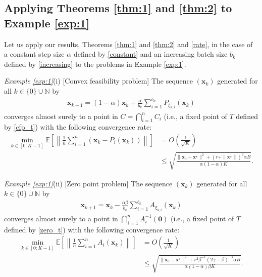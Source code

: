\documentclass[smallextended,referee,envcountsect,]{svjour3}
\begin{document}
\subsection{Applying Theorems \ref{thm:1} and \ref{thm:2} to Example \ref{exp:1}} 
Let us apply our results, Theorems \ref{thm:1} and \ref{thm:2} and \eqref{rate}, in the case of a constant step size $\alpha$ defined by \eqref{constant} and an increasing batch size $b_k$ defined by \eqref{increasing} to the problems in Example \ref{exp:1}.

\textit{Example \ref{exp:1}}(i) [Convex feasibility problem] The sequence $(\bm{x}_k)$ generated for all $k \in \{0\} \cup \mathbb{N}$ by 
\begin{align*}
\bm{x}_{k+1} = (1 - \alpha) \bm{x}_k + \frac{\alpha}{b_k} \sum_{i=1}^{b_k} P_{\xi_{k,i}} (\bm{x}_k) 
\end{align*}
converges almost surely to a point in $C = \bigcap_{i=1}^n C_i$ (i.e., a fixed point of $T$ defined by \eqref{cfp_t}) with the following convergence rate:
\begin{align*}
\min_{k \in [0:K-1]} \mathbb{E} \left[  \left\| \frac{1}{n} \sum_{i=1}^n \left( \bm{x}_k - P_i (\bm{x}_k) \right) \right\| \right] 
&= O \left( \frac{1}{\sqrt{K}} \right)\\
&\leq
\sqrt{ 
\frac{\| \bm{x}_{0} - \bm{x}^\star \|^2 
+ 
(r + \|\bm{x}^\star\|)^2 \alpha B}{\alpha (1 - \alpha) K}}.
\end{align*} 

\textit{Example \ref{exp:1}}(ii) [Zero point problem] The sequence $(\bm{x}_k)$ generated for all $k \in \{0\} \cup \mathbb{N}$ by 
\begin{align*}
\bm{x}_{k+1} = \bm{x}_k - \frac{\alpha \beta}{b_k} \sum_{i=1}^{b_k} A_{\xi_{k,i}} (\bm{x}_k) 
\end{align*}
converges almost surely to a point in $\bigcap_{i=1}^n A_i^{-1}(\bm{0})$ (i.e., a fixed point of $T$ defined by \eqref{zero_t}) with the following convergence rate:
\begin{align*}
\min_{k \in [0:K-1]} \mathbb{E} \left[  \left\| \frac{1}{n} \sum_{i=1}^n A_i (\bm{x}_k)  \right\| \right] 
&= O \left( \frac{1}{\sqrt{K}} \right)\\
&\leq
\sqrt{ 
\frac{\| \bm{x}_{0} - \bm{x}^\star \|^2 
+ 
r^2 \beta^{-1} (2 \gamma - \beta)^{-1} \alpha B}{\alpha (1 - \alpha) \beta K}}.
\end{align*}
\end{document}
